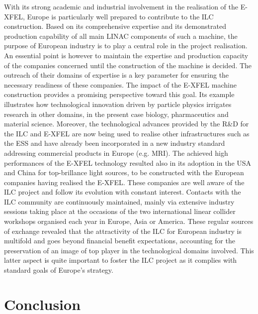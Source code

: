 \documentclass[%
 reprint,
 floatfix,
 amsmath,amssymb,
 aps,
]{revtex4-1}
\begin{document}
With its strong academic and industrial involvement in the realisation of the E-XFEL, Europe is
particularly well prepared to contribute to the ILC construction. Based on its comprehensive expertise
and its demonstrated production capability of all main LINAC components of such a machine, the
purpose of European industry is to play a central role in the project realisation. An essential point
is however to maintain the expertise and production capacity of the companies concerned until the
construction of the machine is decided.
The outreach of their domains of expertise is a key parameter for ensuring the necessary readiness
of these companies. The impact of the E-XFEL machine construction provides a promising perspective
toward this goal. Its example illustrates how technological innovation driven by particle physics irrigates
research in other domains, in the present case biology, pharmaceutics and material science. Moreover, 
the technological advances provided by the R\&D for the ILC and E-XFEL are now being used to realise
other infrastructures such as the ESS and have already been incorporated in a new industry standard
addressing commercial products in Europe (e.g. MRI). The achieved high performances of the E-XFEL
technology resulted also in its adoption in the USA and China for top-brillance light sources, to be
constructed with the European companies having realised the E-XFEL.
These companies are well aware of the ILC project and follow its evolution with constant interest.
Contacts with the ILC community are continuously maintained, mainly via extensive industry sessions
taking place at the occasions of the two international linear collider workshops organised each year in
Europe, Asia or America. These regular sources of exchange revealed that the attractivity of the ILC
for European industry is multifold and goes beyond financial benefit expectations, accounting for the
preservation of an image of top player in the technological domains involved. This latter aspect is quite
important to foster the ILC project as it complies with standard goals of Europe's strategy.

\section{Conclusion}



\end{document}
